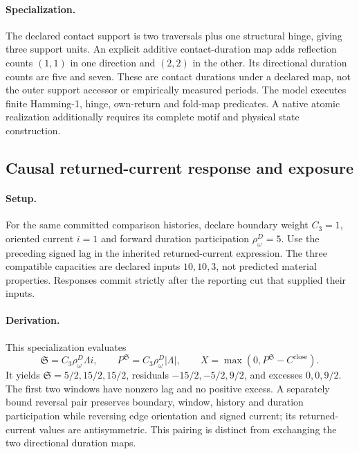 \paragraph{Specialization.}
The declared contact support is two traversals plus one structural hinge, giving three support units. An explicit additive contact-duration map adds reflection counts \((1,1)\) in one direction and \((2,2)\) in the other. Its directional duration counts are five and seven. These are contact durations under a declared map, not the outer support accessor or empirically measured periods. The model executes finite Hamming-1, hinge, own-return and fold-map predicates. A native atomic realization additionally requires its complete motif and physical state construction.


\subsection{Causal returned-current response and exposure}
\paragraph{Setup.}
For the same committed comparison histories, declare boundary weight \(C_3=1\), oriented current \(i=1\) and forward duration participation \(\rho^D_\omega=5\). Use the preceding signed lag in the inherited returned-current expression. The three compatible capacities are declared inputs \(10,10,3\), not predicted material properties. Responses commit strictly after the reporting cut that supplied their inputs.

\paragraph{Derivation.}
This specialization evaluates
\[
\mathfrak S=C_3\rho^D_\omega\Lambda i,\qquad
P^{\mathfrak S}=C_3\rho^D_\omega|\Lambda|,\qquad
X=\max(0,P^{\mathfrak S}-C^{\mathrm{close}}).
\]
It yields \(\mathfrak S=5/2,15/2,15/2\), residuals \(-15/2,-5/2,9/2\), and excesses \(0,0,9/2\). The first two windows have nonzero lag and no positive excess. A separately bound reversal pair preserves boundary, window, history and duration participation while reversing edge orientation and signed current; its returned-current values are antisymmetric. This pairing is distinct from exchanging the two directional duration maps.

